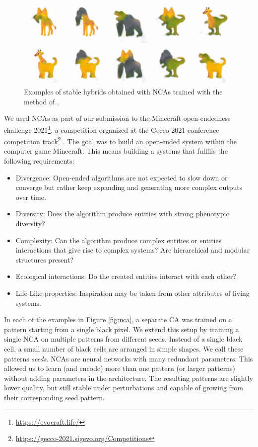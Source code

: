 \begin{figure}[htbp]
  \centering
  \includegraphics[width=.8\linewidth]{figures/nca_hybrids.png}
  \caption{Examples of stable hybrids obtained with \acp{NCA} trained with the
    method of \parencite{cisnerosOpenendedCreationHybrid2021}.}
  \label{fig:nca_hybrid}
\end{figure}


We used \acp{NCA} as part of our submission to the Minecraft open-endedness
challenge 2021\footnote{\url{https://evocraft.life/}}, a competition organized
at the Gecco 2021 conference competition
track\footnote{\url{https://gecco-2021.sigevo.org/Competitions}}
\parencite{cisnerosOpenendedCreationHybrid2021}. The goal was to build an
open-ended system within the computer game Minecraft. This means building a
systems that fullfils the following requirements:

\begin{itemize}
  \item Divergence: Open-ended algorithms are not expected to slow down or
        converge but rather keep expanding and generating more complex outputs
        over time.

  \item Diversity: Does the algorithm produce entities with strong phenotypic
        diversity?

  \item Complexity: Can the algorithm produce complex entities or entities
        interactions that give rise to complex systems? Are hierarchical and
        modular structures present?

  \item Ecological interactions: Do the created entities interact with each
        other?

  \item Life-Like properties: Inspiration may be taken from other attributes of
        living systems.
\end{itemize}

In each of the examples in Figure \ref{fig:nca}, a separate \ac{CA} was trained
on a pattern starting from a single black pixel. We extend this setup by
training a single \ac{NCA} on multiple patterns from different seeds. Instead of
a single black cell, a small number of black cells are arranged in simple
shapes. We call these patterns \emph{seeds}. \acp{NCA} are neural networks with many redundant parameters. This allowed us to learn (and encode) more than one
pattern (or larger patterns) without adding parameters in the architecture. The
resulting patterns are slightly lower quality, but still stable under
perturbations and capable of growing from their corresponding seed pattern.

